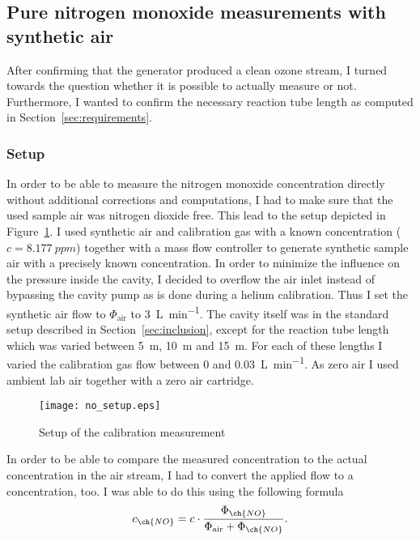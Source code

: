 \subsection{Pure nitrogen monoxide measurements with synthetic air}
\label{sec:no}

After confirming that the generator produced a clean ozone stream, I
turned towards the question whether it is possible to actually measure
 or not. Furthermore, I wanted to confirm the necessary
reaction tube length as computed in Section~\ref{sec:requirements}.

\subsubsection{Setup}
\label{sec:no-setup}

In order to be able to measure the nitrogen monoxide concentration
directly without additional corrections and computations, I had to
make sure that the used sample air was nitrogen dioxide free. This
lead to the setup depicted in Figure~\ref{fig:no-setup}. I used
synthetic air and  calibration gas with a known 
concentration ($c = \SI{8.177}{ppm}$) together with a mass flow
controller to generate synthetic sample air with a precisely known
 concentration. In order to minimize the influence on the
pressure inside the cavity, I decided to overflow the air inlet
instead of bypassing the cavity pump as is done during a helium
calibration. Thus I set the synthetic air flow to $\Phi_{\text{air}}$
to \SI{3}{\liter\per\minute}. The cavity itself was in the standard
setup described in Section~\ref{sec:inclusion}, except for the
reaction tube length which was varied between \SI{5}{\meter},
\SI{10}{\meter} and \SI{15}{\meter}. For each of these lengths I
varied the  calibration gas flow between \num{0} and
\SI{0.03}{\liter\per\minute}. As zero air I used ambient lab air
together with a zero air cartridge.

\begin{figure}[htbp]
  \centering
  \texttt{[image: no\_setup.eps]}
  \caption{Setup of the calibration measurement}
  \label{fig:no-setup}
\end{figure}

In order to be able to compare the measured  concentration to the
actual concentration in the air stream, I had to convert the applied
 flow to a concentration, too. I was able to do this using the
following formula
\begin{align}
  c_{\ch{NO}} = c \cdot \frac{\Phi_{\ch{NO}}}{\Phi_{\text{air}} +
  \Phi_{\ch{NO}}}. \label{eq:c-flow}
\end{align}

